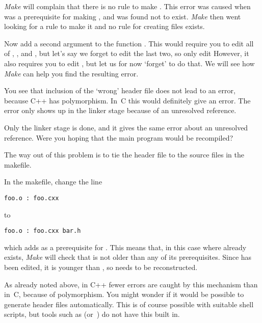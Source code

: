   {\emph{Make} will complain that there is no rule to make
    . This error was caused when  was a
    prerequisite for making , and was found not to exist. 
    \emph{Make} then went
    looking for a rule to make it and no rule for creating 
    files exists.}{}

Now add a second argument to the function .
This would require you to edit all of , ,
and , 
but let's say we forget to edit the last two, so only edit 
However, it also requires you to edit , but let us for
now `forget' to do that. We will see how \emph{Make} can help you find
the resulting error.

          {You see that inclusion of the `wrong' header file
            does not lead to an error, because C++ has polymorphism.
            In~C this would definitely give an error.
            The error only shows up in the linker stage
            because of an unresolved reference.}{}

    {Only the linker stage is done, and it gives the same error about
      an unresolved reference. Were you hoping that the main program
    would be recompiled?}

The way out of this problem is to tie the header file to the source files
in the makefile.

In the makefile, change the line
\begin{lstlisting}
foo.o : foo.cxx
\end{lstlisting}
to
\begin{lstlisting}
foo.o : foo.cxx bar.h
\end{lstlisting}
which adds  as a prerequisite for . This means that,
in this case where  already exists, \emph{Make} will check
that  is not older than any of its prerequisites. Since
 has been edited, it is younger than , so 
needs to be reconstructed.

\begin{remark}
  As already noted above, in C++ fewer errors are caught by this
  mechanism than in~C, because of polymorphism.
  You might wonder if it would be possible to generate header files
  automatically. This is of course possible with suitable shell scripts,
  but tools such as  (or~) do not have this built in.
\end{remark}

